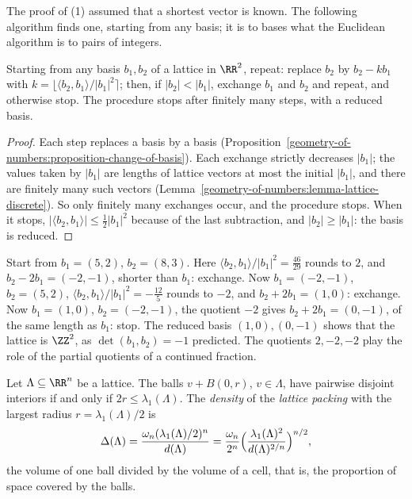 The proof of (1) assumed that a shortest vector is known. The following algorithm finds one, starting from any basis; it is to bases what the Euclidean algorithm is to pairs of integers.

\begin{proposition}\label{geometry-of-numbers:proposition-gauss-algorithm}
Starting from any basis $b_1, b_2$ of a lattice in $\RR^2$, repeat: replace $b_2$ by $b_2 - kb_1$ with $k = \lfloor\langle b_2, b_1 \rangle/|b_1|^2\rceil$; then, if $|b_2| < |b_1|$, exchange $b_1$ and
$b_2$ and repeat, and otherwise stop. The procedure stops after finitely many steps, with a reduced basis.
\end{proposition}

\begin{proof}
Each step replaces a basis by a basis (Proposition~\ref{geometry-of-numbers:proposition-change-of-basis}). Each exchange strictly decreases $|b_1|$; the values taken by $|b_1|$ are lengths of lattice
vectors at most the initial $|b_1|$, and there are finitely many such vectors (Lemma~\ref{geometry-of-numbers:lemma-lattice-discrete}). So only finitely many exchanges occur, and the procedure stops.
When it stops, $|\langle b_2, b_1 \rangle| \leq \frac12|b_1|^2$ because of the last subtraction, and $|b_2| \geq |b_1|$: the basis is reduced.
\end{proof}

\begin{example}\label{geometry-of-numbers:example-gauss-algorithm}
Start from $b_1 = (5, 2)$, $b_2 = (8, 3)$. Here $\langle b_2, b_1 \rangle/|b_1|^2 = \frac{46}{29}$ rounds to $2$, and $b_2 - 2b_1 = (-2, -1)$, shorter than $b_1$: exchange. Now $b_1 = (-2, -1)$,
$b_2 = (5, 2)$, $\langle b_2, b_1 \rangle/|b_1|^2 = -\frac{12}{5}$ rounds to $-2$, and $b_2 + 2b_1 = (1, 0)$: exchange. Now $b_1 = (1, 0)$, $b_2 = (-2, -1)$, the quotient $-2$ gives
$b_2 + 2b_1 = (0, -1)$, of the same length as $b_1$: stop. The reduced basis $(1, 0), (0, -1)$ shows that the lattice is $\ZZ^2$, as $\det(b_1, b_2) = -1$ predicted. The quotients $2, -2, -2$ play the role
of the partial quotients of a continued fraction.
\end{example}

\begin{definition}\label{geometry-of-numbers:definition-packing-density}
Let $\Lambda \subseteq \RR^n$ be a lattice. The balls $v + B(0, r)$, $v \in \Lambda$, have pairwise disjoint interiors if and only if $2r \leq \lambda_1(\Lambda)$. The \emph{density} of the
\emph{lattice packing} with the largest radius $r = \lambda_1(\Lambda)/2$ is
\[
\Delta(\Lambda) = \frac{\omega_n(\lambda_1(\Lambda)/2)^n}{d(\Lambda)} = \frac{\omega_n}{2^n}\Bigl(\frac{\lambda_1(\Lambda)^2}{d(\Lambda)^{2/n}}\Bigr)^{n/2},
\]
the volume of one ball divided by the volume of a cell, that is, the proportion of space covered by the balls.
\end{definition}

